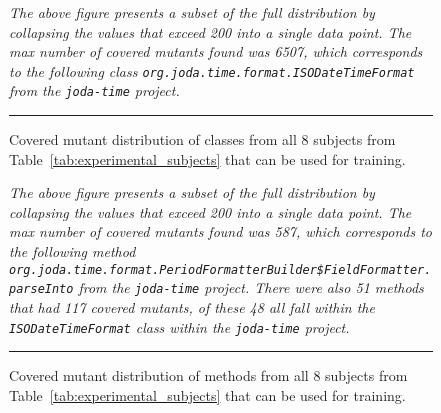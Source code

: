 \begin{figure}[!tb]
  \centering
  \caption{Covered mutant distribution of classes from all 8 subjects from Table~\ref{tab:experimental_subjects} that can be used for training.}
  \vspace{1mm}
  \footnotesize{\emph{The above figure presents a subset of the full distribution by collapsing the values that exceed 200 into a single data point. The max number of covered mutants found was 6507, which corresponds to the following class \texttt{org.joda.time.format.ISODateTimeFormat} from the \texttt{joda-time} project.}}
  \vspace{2mm}
  \hrule
  \label{fig:covered_mutant_distributions_class_all}
\end{figure}

\begin{figure}[!tb]
  \centering
  \caption{Covered mutant distribution of methods from all 8 subjects from Table~\ref{tab:experimental_subjects} that can be used for training.}
  \vspace{1mm}
  \footnotesize{\emph{The above figure presents a subset of the full distribution by collapsing the values that exceed 200 into a single data point. The max number of covered mutants found was 587, which corresponds to the following method \texttt{org.joda.time.format.PeriodFormatterBuilder\$FieldFormatter.parseInto} from the \texttt{joda-time} project. There were also 51 methods that had 117 covered mutants, of these 48 all fall within the \texttt{ISODateTimeFormat} class within the \texttt{joda-time} project.}}
  \vspace{2mm}
  \hrule
  \label{fig:covered_mutant_distributions_method_all}
\end{figure}

